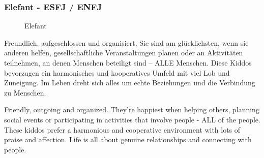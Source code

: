 \subsubsection{Elefant - ESFJ / ENFJ}
\begin{figure}[htbp!]
	\centering
	\caption[Elefant]{Elefant \cite{knowAndLove}}
	\label{img:Elefant}
\end{figure}
Freundlich, aufgeschlossen und organisiert. Sie sind am glücklichsten, wenn sie anderen helfen, gesellschaftliche Veranstaltungen planen oder an Aktivitäten teilnehmen, an denen Menschen beteiligt sind – ALLE Menschen. Diese Kiddos bevorzugen ein harmonisches und kooperatives Umfeld mit viel Lob und Zuneigung. Im Leben dreht sich alles um echte Beziehungen und die Verbindung zu Menschen. 

Friendly, outgoing and organized. They're happiest when helping others, planning social events or participating in activities that involve people - ALL of the people. These kiddos prefer a harmonious and cooperative environment with lots of praise and affection. Life is all about genuine relationships and connecting with people.	\\
